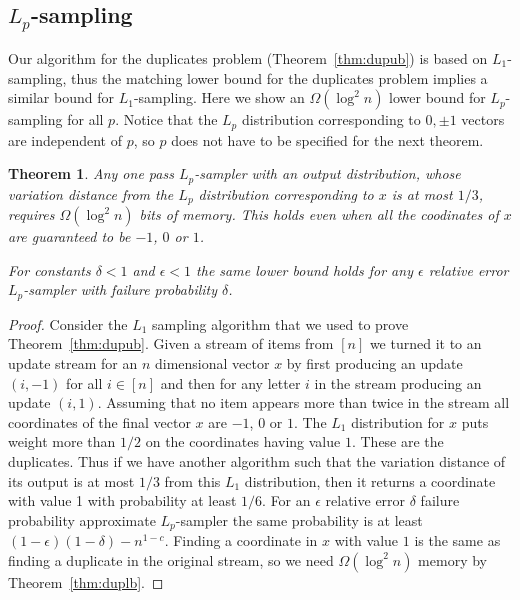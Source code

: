 \documentclass[9pt,letterpaper]{article}
\newtheorem{theorem}{Theorem}
\theoremstyle{remark}
\begin{document}
\subsection{$L_p$-sampling}
Our algorithm for the duplicates problem (Theorem~\ref{thm:dupub}) is based on
$L_1$-sampling, thus the matching lower bound for the duplicates problem
implies a similar bound for $L_1$-sampling. Here we show an $\Omega(\log^2 n)$ lower bound for $L_p$-sampling for all $p$.
 Notice that the $L_p$ distribution corresponding to $0,\pm1$
vectors are independent of $p$, so $p$ does not have to be specified for the
next theorem.

\begin{theorem}\label{lpl}
Any one pass
$L_p$-sampler with an output distribution,
whose variation distance from the $L_p$ distribution corresponding to $x$ is
at most $1/3$, requires $\Omega(\log^2n)$ bits of memory. This holds even
when all the coodinates of $x$
are
guaranteed to be $-1$, $0$ or $1$.

For constants $\delta<1$ and $\epsilon<1$ the same lower bound holds for any
$\epsilon$ relative error $L_p$-sampler with failure probability $\delta$.
\end{theorem}

\begin{proof}
Consider the $L_1$ sampling algorithm that we used to prove
Theorem~\ref{thm:dupub}. Given a stream of items from $[n]$ we turned it to
an update stream for an $n$ dimensional vector $x$ by first
producing an update $(i,-1)$ for all $i\in[n]$ and then for any letter $i$ in
the stream producing an update $(i,1)$. Assuming that no item appears more
than twice in the stream all coordinates of the final vector $x$ are $-1$, $0$
or $1$. The $L_1$ distribution for $x$ puts weight more than $1/2$ on the
coordinates having value $1$. These are the duplicates. Thus if we have
another algorithm such that the variation distance of its output is at most
$1/3$ from this $L_1$ distribution, then it returns a coordinate with value 1
with probability at least $1/6$. For an $\epsilon$ relative error $\delta$
failure probability approximate $L_p$-sampler the same probability is at least
$(1-\epsilon)(1-\delta)-n^{1-c}$. Finding a coordinate in $x$ with value $1$
is the same as finding a duplicate in the original stream, so we need
$\Omega(\log^2n)$ memory by Theorem~\ref{thm:duplb}.
\end{proof}
\end{document}
